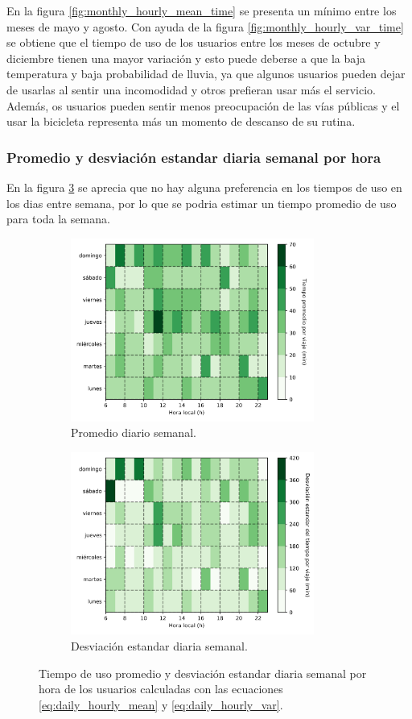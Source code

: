 En la figura \ref{fig:monthly_hourly_mean_time} se presenta un mínimo entre los meses de mayo y agosto. Con ayuda de la figura \ref{fig:monthly_hourly_var_time} se obtiene que el tiempo de uso de los usuarios entre los meses de octubre y diciembre tienen una mayor variación y esto puede deberse a que la baja temperatura y baja probabilidad de lluvia\cite{clima_guadalajara}, ya que algunos usuarios pueden dejar de usarlas al sentir una incomodidad y otros prefieran usar más el servicio. Además, os usuarios pueden sentir menos preocupación de las vías públicas y el usar la bicicleta representa más un momento de descanso de su rutina.

\subsubsection{Promedio y desviación estandar diaria semanal por hora}

En la figura \ref{fig:daily_hourly_time} se aprecia que no hay alguna preferencia en los tiempos de uso en los dias entre semana, por lo que se podria estimar un tiempo promedio de uso para toda la semana.

\begin{figure}[H]
    \centering
    \begin{subfigure}[b]{8cm}
        \includegraphics[width=8cm]{Graphics/daily_hourly_mean_time_travel.png}
        \caption{Promedio diario semanal.}
        \label{fig:daily_hourly_mean_time}
    \end{subfigure}
    \begin{subfigure}[b]{8cm}
        \includegraphics[width=8cm]{Graphics/daily_hourly_var_time_travel.png}
        \caption{Desviación estandar diaria semanal.}
        \label{fig:daily_hourly_var_time}
    \end{subfigure}
    \caption{Tiempo de uso promedio y desviación estandar diaria semanal por hora de los usuarios calculadas con las ecuaciones \ref{eq:daily_hourly_mean} y \ref{eq:daily_hourly_var}.}
    \label{fig:daily_hourly_time}
\end{figure}

